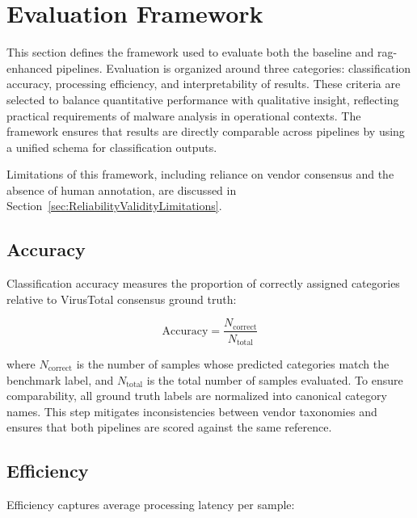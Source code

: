 \section{Evaluation Framework}\label{sec:EvaluationFramework}
This section defines the framework used to evaluate both the baseline and \gls{rag}-enhanced
pipelines. Evaluation is organized around three categories: classification accuracy, processing
efficiency, and interpretability of results. These criteria are selected to balance quantitative
performance with qualitative insight, reflecting practical requirements of malware analysis in
operational contexts. The framework ensures that results are directly comparable across pipelines
by using a unified schema for classification outputs.

Limitations of this framework, including reliance on vendor consensus and the absence of human
annotation, are discussed in Section~\ref{sec:ReliabilityValidityLimitations}.

\subsection{Accuracy}\label{subsec:Accuracy}

Classification accuracy measures the proportion of correctly assigned categories relative to
VirusTotal consensus ground truth:

\begin{equation}
      \text{Accuracy} = \frac{N_{\text{correct}}}{N_{\text{total}}}
\end{equation}

where \(N_{\text{correct}}\) is the number of samples whose predicted categories match the
benchmark label, and \(N_{\text{total}}\) is the total number of samples evaluated. To ensure
comparability, all ground truth labels are normalized into canonical category names. This step
mitigates inconsistencies between vendor taxonomies and ensures that both pipelines are scored
against the same reference.

\subsection{Efficiency}\label{subsec:Efficiency}

Efficiency captures average processing latency per sample:

